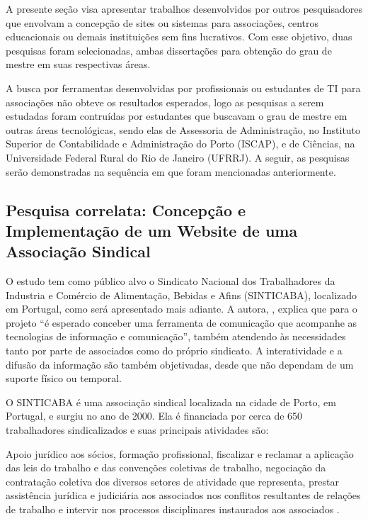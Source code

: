 A presente seção visa apresentar trabalhos desenvolvidos por outros pesquisadores que envolvam a concepção de sites ou sistemas para associações, centros educacionais ou demais instituições sem fins lucrativos. Com esse objetivo, duas pesquisas foram selecionadas, ambas dissertações para obtenção do grau de mestre em suas respectivas áreas. 

A busca por ferramentas desenvolvidas por profissionais ou estudantes de TI para associações não obteve os resultados esperados, logo as pesquisas a serem estudadas foram contruídas por estudantes que buscavam o grau de mestre em outras áreas tecnológicas, sendo elas de Assessoria de Administração, no Instituto Superior de Contabilidade e Administração do Porto (ISCAP), e de Ciências, na Universidade Federal Rural do Rio de Janeiro (UFRRJ). A seguir, as pesquisas serão demonstradas na sequência em que foram mencionadas anteriormente. 

\hspace{2.5cm}
\subsection{Pesquisa correlata: Concepção e Implementação de um Website de uma Associação Sindical}
\hspace{2.5cm}

O estudo tem como público alvo o Sindicato Nacional dos Trabalhadores da Industria e Comércio de Alimentação, Bebidas e Afins (SINTICABA), localizado em Portugal, como será apresentado mais adiante. A autora, , explica que para o projeto ``é esperado conceber uma ferramenta de comunicação que acompanhe as tecnologias de informação e comunicação'', também atendendo às necessidades tanto por parte de associados como do próprio sindicato. A interatividade e a difusão da informação são também objetivadas, desde que não dependam de um suporte físico ou temporal.

O SINTICABA é uma associação sindical localizada na cidade de Porto, em Portugal, e surgiu no ano de 2000. Ela é financiada por cerca de 650 trabalhadores sindicalizados e suas principais atividades são: 

\begin{citacao}
Apoio jurídico aos sócios, formação profissional, fiscalizar e reclamar a aplicação das leis do trabalho e das convenções coletivas de trabalho, negociação da contratação coletiva dos diversos setores de atividade que representa, prestar assistência jurídica e judiciária aos associados nos conflitos resultantes de relações de trabalho e intervir nos processos disciplinares instaurados aos associados .
\end{citacao}

